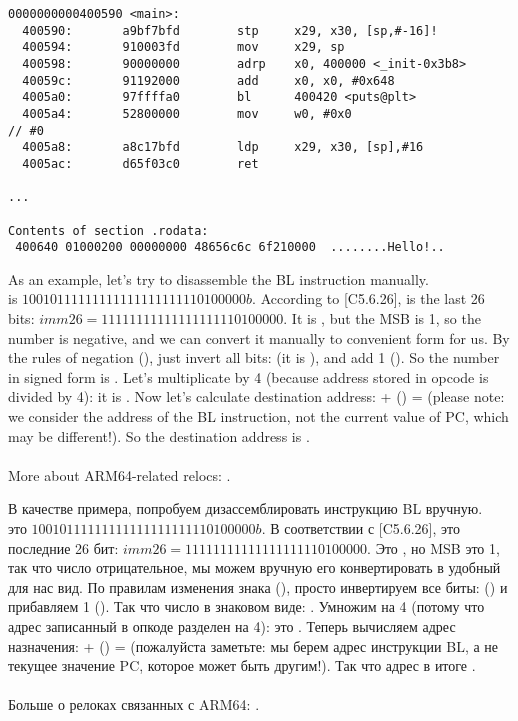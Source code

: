 \begin{lstlisting}[caption=objdump \EN{of executable file}\RU{исполняемого файла}]
0000000000400590 <main>:
  400590:       a9bf7bfd        stp     x29, x30, [sp,#-16]!
  400594:       910003fd        mov     x29, sp
  400598:       90000000        adrp    x0, 400000 <_init-0x3b8>
  40059c:       91192000        add     x0, x0, #0x648
  4005a0:       97ffffa0        bl      400420 <puts@plt>
  4005a4:       52800000        mov     w0, #0x0                        // #0
  4005a8:       a8c17bfd        ldp     x29, x30, [sp],#16
  4005ac:       d65f03c0        ret

...

Contents of section .rodata:
 400640 01000200 00000000 48656c6c 6f210000  ........Hello!..
\end{lstlisting}


\ifdefined\ENGLISH{}
As an example, let's try to disassemble the BL instruction manually.\\
 is $10010111111111111111111110100000b$.
According to [\ARMSixFourRef C5.6.26],  is the last 26 bits: $imm26 = 11111111111111111110100000$.
It is , but the \ac{MSB} is 1, 
so the number is negative, and we can convert it manually to convenient form for us.
By the rules of negation (), just invert all bits: (it is ), and add 1 ().
So the number in signed form is .
Let's multiplicate  by 4 (because address stored in opcode is divided by 4): it is .
Now let's calculate destination address:  + () =  
(please note: we consider the address of the BL instruction, not the current value of \ac{PC}, which may be different!).
So the destination address is .\\
\\
More about ARM64-related relocs: \ARMELF.
\fi

\ifdefined\RUSSIAN{}
В качестве примера, попробуем дизассемблировать инструкцию BL вручную.\\
 это $10010111111111111111111110100000b$.
В соответствии с [\ARMSixFourRef C5.6.26],  это последние 26 бит: $imm26 = 11111111111111111110100000$.
Это , но \ac{MSB} это 1, 
так что число отрицательное, мы можем вручную его конвертировать в удобный для нас вид.
По правилам изменения знака (), просто инвертируем все биты: () и прибавляем 1 ().
Так что число в знаковом виде: .
Умножим  на 4 (потому что адрес записанный в опкоде разделен на 4): это .
Теперь вычисляем адрес назначения:  + () =  
(пожалуйста заметьте: мы берем адрес инструкции BL, а не текущее значение \ac{PC}, которое может быть другим!).
Так что адрес в итоге .\\
\\
Больше о релоках связанных с ARM64: \ARMELF.
\fi
